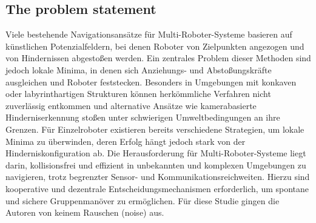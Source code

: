 \documentclass[conference]{IEEEtran}
\begin{document}
\subsection{The problem statement}
Viele bestehende Navigationsansätze für Multi-Roboter-Systeme basieren auf künstlichen Potenzialfeldern, bei denen Roboter von Zielpunkten angezogen und von Hindernissen abgestoßen werden. Ein zentrales Problem dieser Methoden sind jedoch lokale Minima, in denen sich Anziehungs- und Abstoßungskräfte ausgleichen und Roboter feststecken. Besonders in Umgebungen mit konkaven oder labyrinthartigen Strukturen können herkömmliche Verfahren nicht zuverlässig entkommen und alternative Ansätze wie kamerabasierte Hinderniserkennung stoßen unter schwierigen Umweltbedingungen an ihre Grenzen. Für Einzelroboter existieren bereits verschiedene Strategien, um lokale Minima zu überwinden, deren Erfolg hängt jedoch stark von der Hinderniskonfiguration ab. Die Herausforderung für Multi-Roboter-Systeme liegt darin, kollisionsfrei und effizient in unbekannten und komplexen Umgebungen zu navigieren, trotz begrenzter Sensor- und Kommunikationsreichweiten. Hierzu sind kooperative und dezentrale Entscheidungsmechanismen erforderlich, um spontane und sichere Gruppenmanöver zu ermöglichen. Für diese Studie gingen die Autoren von keinem Rauschen (noise) aus.
\end{document}
